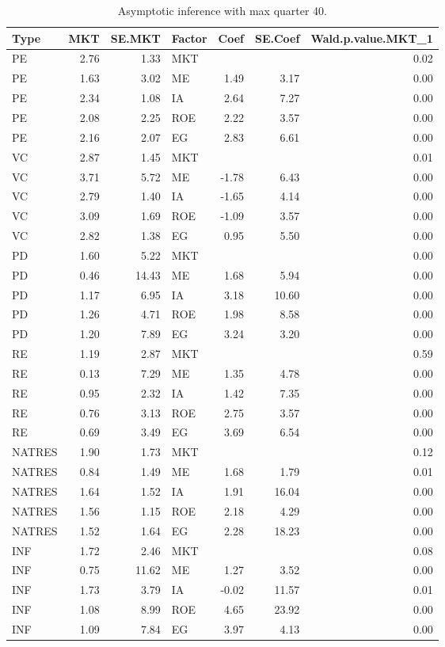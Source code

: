 \documentclass[12pt]{article}
\begin{document}
\begin{table}[ht]
	\centering
	\begin{tabular}{lrrlrrr}
		Type & MKT & SE.MKT & Factor & Coef & SE.Coef & Wald.p.value.MKT\_1 \\ 
		\hline
		\hline
		PE & 2.76 & 1.33 & MKT &  &  & 0.02 \\ 
		PE & 1.63 & 3.02 & ME & 1.49 & 3.17 & 0.00 \\ 
		PE & 2.34 & 1.08 & IA & 2.64 & 7.27 & 0.00 \\ 
		PE & 2.08 & 2.25 & ROE & 2.22 & 3.57 & 0.00 \\ 
		PE & 2.16 & 2.07 & EG & 2.83 & 6.61 & 0.00 \\
		\hline
		VC & 2.87 & 1.45 & MKT &  &  & 0.01 \\ 
		VC & 3.71 & 5.72 & ME & -1.78 & 6.43 & 0.00 \\ 
		VC & 2.79 & 1.40 & IA & -1.65 & 4.14 & 0.00 \\ 
		VC & 3.09 & 1.69 & ROE & -1.09 & 3.57 & 0.00 \\ 
		VC & 2.82 & 1.38 & EG & 0.95 & 5.50 & 0.00 \\ 
		\hline
		PD & 1.60 & 5.22 & MKT &  &  & 0.00 \\ 
		PD & 0.46 & 14.43 & ME & 1.68 & 5.94 & 0.00 \\ 
		PD & 1.17 & 6.95 & IA & 3.18 & 10.60 & 0.00 \\ 
		PD & 1.26 & 4.71 & ROE & 1.98 & 8.58 & 0.00 \\ 
		PD & 1.20 & 7.89 & EG & 3.24 & 3.20 & 0.00 \\ 
		\hline
		RE & 1.19 & 2.87 & MKT &  &  & 0.59 \\ 
		RE & 0.13 & 7.29 & ME & 1.35 & 4.78 & 0.00 \\ 
		RE & 0.95 & 2.32 & IA & 1.42 & 7.35 & 0.00 \\ 
		RE & 0.76 & 3.13 & ROE & 2.75 & 3.57 & 0.00 \\ 
		RE & 0.69 & 3.49 & EG & 3.69 & 6.54 & 0.00 \\ 
		\hline
		NATRES & 1.90 & 1.73 & MKT &  &  & 0.12 \\ 
		NATRES & 0.84 & 1.49 & ME & 1.68 & 1.79 & 0.01 \\ 
		NATRES & 1.64 & 1.52 & IA & 1.91 & 16.04 & 0.00 \\ 
		NATRES & 1.56 & 1.15 & ROE & 2.18 & 4.29 & 0.00 \\ 
		NATRES & 1.52 & 1.64 & EG & 2.28 & 18.23 & 0.00 \\ 
		\hline
		INF & 1.72 & 2.46 & MKT &  &  & 0.08 \\ 
		INF & 0.75 & 11.62 & ME & 1.27 & 3.52 & 0.00 \\ 
		INF & 1.73 & 3.79 & IA & -0.02 & 11.57 & 0.01 \\ 
		INF & 1.08 & 8.99 & ROE & 4.65 & 23.92 & 0.00 \\ 
		INF & 1.09 & 7.84 & EG & 3.97 & 4.13 & 0.00 \\ 
		\hline
	\end{tabular}
	\caption{Asymptotic inference with max quarter 40.} 
\end{table}
\end{document}
